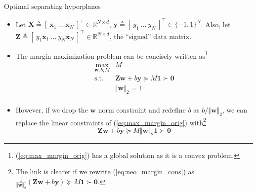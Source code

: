 \documentclass{beamer}
\numberwithin{equation}{section}
\newcommand{\aref}[1]{\alert{\ref{#1}}}
\begin{document}
\begin{frame}{Optimal separating hyperplanes}
    \begin{itemize}
        \item
        Let $ \mathbf{X} \triangleq [ \ \mathbf{x}_1 \ \ldots \
        \mathbf{x}_N \ ]^\top \in \mathbb{R}^{N \times d} $,
        $ \mathbf{y} \triangleq [ \ y_1 \ \ldots \ y_N \ ]^\top \in
        \{-1, 1\}^N $. Also, let $ \mathbf{Z} \triangleq [ \ y_1\mathbf{x}_1 \
        \ldots \ y_N\mathbf{x}_N \ ]^\top \in \mathbb{R}^{N \times d} $,
        the ``signed'' data matrix.

        \item
        The margin maximization problem can be concisely written as\footnote{
            (\aref{eq:max_margin_orig}) has a global solution as it is a convex
            problem.        
        }
        \begin{equation} \label{eq:max_margin_orig}
            \begin{array}{ll}
                \displaystyle\max_{\mathbf{w}, b, M} & M \\
                \text{s.t.} &
                \mathbf{Z}\mathbf{w} + b\mathbf{y} \succeq M\mathbf{1}
                \succ \mathbf{0} \\
                & \Vert\mathbf{w}\Vert_2 = 1 \\
            \end{array}
        \end{equation}

        \item
        However, if we drop the $ \mathbf{w} $ norm constraint and redefine
        $ b $ as $ b / \Vert\mathbf{w}\Vert_2 $, we can replace the linear
        constraints
        of (\aref{eq:max_margin_orig}) with\footnote{
            The link is clearer if we rewrite (\aref{eq:neo_margin_cons}) as
            $ \frac{1}{\Vert\mathbf{w}\Vert_2}(\mathbf{Zw} + b\mathbf{y})
            \succeq M\mathbf{1} \succ \mathbf{0} $. %
            \vspace{0.01 pt}
        } \cite{esl}
        \begin{equation} \label{eq:neo_margin_cons}
            \mathbf{Zw} + b\mathbf{y} \succeq M\Vert\mathbf{w}\Vert_2\mathbf{1}
            \succ \mathbf{0}
        \end{equation}
    \end{itemize}
\end{frame}
\end{document}
